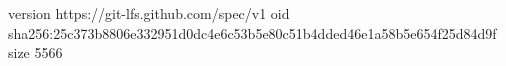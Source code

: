 version https://git-lfs.github.com/spec/v1
oid sha256:25c373b8806e332951d0dc4e6c53b5e80c51b4dded46e1a58b5e654f25d84d9f
size 5566

